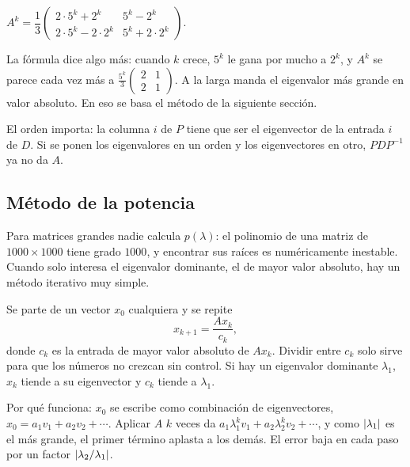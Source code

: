 \documentclass[11pt,letterpaper]{article}
\begin{document}
\begin{resultado}
    $A^k = \dfrac{1}{3}
    \begin{pmatrix}
        2 \cdot 5^k + 2^k & 5^k - 2^k \\
        2 \cdot 5^k - 2 \cdot 2^k & 5^k + 2 \cdot 2^k
    \end{pmatrix}$.
\end{resultado}

\begin{idea}
    La fórmula dice algo más: cuando $k$ crece, $5^k$ le gana por
    mucho a $2^k$, y $A^k$ se parece cada vez más a
    $\tfrac{5^k}{3}\left(\begin{smallmatrix} 2 & 1 \\ 2 & 1
    \end{smallmatrix}\right)$. A la larga manda el eigenvalor más
    grande en valor absoluto. En eso se basa el método de la
    siguiente sección.
\end{idea}

\begin{ojo}
    El orden importa: la columna $i$ de $P$ tiene que ser el
    eigenvector de la entrada $i$ de $D$. Si se ponen los eigenvalores
    en un orden y los eigenvectores en otro, $PDP^{-1}$ ya no da $A$.
\end{ojo}


\subsection*{Método de la potencia}

Para matrices grandes nadie calcula $p(\lambda)$: el polinomio de una
matriz de $1000 \times 1000$ tiene grado $1000$, y encontrar sus
raíces es numéricamente inestable. Cuando solo interesa el eigenvalor
dominante, el de mayor valor absoluto, hay un método iterativo muy
simple.

Se parte de un vector $x_0$ cualquiera y se repite
\[
    x_{k+1} = \frac{A x_k}{c_k} ,
\]
donde $c_k$ es la entrada de mayor valor absoluto de $A x_k$. Dividir
entre $c_k$ solo sirve para que los números no crezcan sin control.
Si hay un eigenvalor dominante $\lambda_1$, $x_k$ tiende a su
eigenvector y $c_k$ tiende a $\lambda_1$.

\begin{idea}
    Por qué funciona: $x_0$ se escribe como combinación de
    eigenvectores, $x_0 = a_1 v_1 + a_2 v_2 + \cdots$. Aplicar $A$ $k$
    veces da $a_1 \lambda_1^k v_1 + a_2 \lambda_2^k v_2 + \cdots$, y
    como $\left\lvert \lambda_1 \right\rvert$ es el más grande, el primer término aplasta
    a los demás. El error baja en cada paso por un factor
    $\left\lvert \lambda_2 / \lambda_1 \right\rvert$.
\end{idea}
\end{document}
